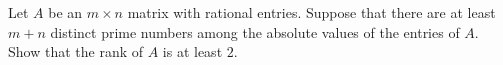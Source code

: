 Let $A$ be an $m\times n$ matrix with rational entries. Suppose that there are at least $m+n$ distinct prime numbers among the absolute values of the entries of $A.$ Show that the rank of $A$ is at least $2.$